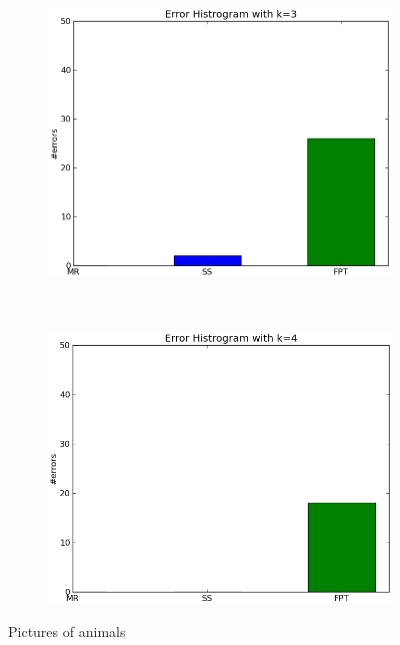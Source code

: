 \documentclass[compressed,final,notitlepage,narroweqnarray,inline,twoside,]{ieee}
\begin{document}
\begin{figure}[H]
\begin{subfigure}[b]{0.23\textwidth}
                \label{fig:tiger}
        \end{subfigure}
        ~ 
        \begin{subfigure}[b]{0.23\textwidth}
                \includegraphics[width=\textwidth]{../images/Accuracy_k3}
                \label{fig:mouse}
        \end{subfigure}%
        ~ 
        \begin{subfigure}[b]{0.23\textwidth}
                \includegraphics[width=\textwidth]{../images/Accuracy_k4}
                \label{fig:tiger}
        \end{subfigure}
        
        \caption{Pictures of animals}\label{fig:animals}
\end{figure}
\end{document}
